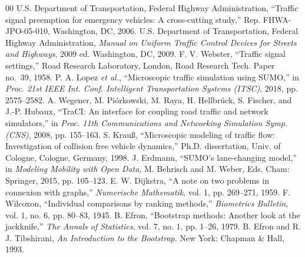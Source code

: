 \documentclass[conference]{IEEEtran}
\begin{document}
\begin{thebibliography}{00}
 U.S. Department of Transportation, Federal Highway Administration, ``Traffic signal preemption for emergency vehicles: A cross-cutting study,'' Rep. FHWA-JPO-05-010, Washington, DC, 2006.
 U.S. Department of Transportation, Federal Highway Administration, \emph{Manual on Uniform Traffic Control Devices for Streets and Highways}, 2009 ed. Washington, DC, 2009.
 F. V. Webster, ``Traffic signal settings,'' Road Research Laboratory, London, Road Research Tech. Paper no.~39, 1958.
 P. A. Lopez \emph{et al.}, ``Microscopic traffic simulation using SUMO,'' in \emph{Proc. 21st IEEE Int. Conf. Intelligent Transportation Systems (ITSC)}, 2018, pp. 2575--2582.
 A. Wegener, M. Pi\'{o}rkowski, M. Raya, H. Hellbr\"{u}ck, S. Fischer, and J.-P. Hubaux, ``TraCI: An interface for coupling road traffic and network simulators,'' in \emph{Proc. 11th Communications and Networking Simulation Symp. (CNS)}, 2008, pp. 155--163.
 S. Krau\ss, ``Microscopic modeling of traffic flow: Investigation of collision free vehicle dynamics,'' Ph.D. dissertation, Univ. of Cologne, Cologne, Germany, 1998.
 J. Erdmann, ``SUMO's lane-changing model,'' in \emph{Modeling Mobility with Open Data}, M. Behrisch and M. Weber, Eds. Cham: Springer, 2015, pp. 105--123.
 E. W. Dijkstra, ``A note on two problems in connexion with graphs,'' \emph{Numerische Mathematik}, vol. 1, pp. 269--271, 1959.
 F. Wilcoxon, ``Individual comparisons by ranking methods,'' \emph{Biometrics Bulletin}, vol. 1, no. 6, pp. 80--83, 1945.
 B. Efron, ``Bootstrap methods: Another look at the jackknife,'' \emph{The Annals of Statistics}, vol. 7, no. 1, pp. 1--26, 1979.
 B. Efron and R. J. Tibshirani, \emph{An Introduction to the Bootstrap}. New York: Chapman \& Hall, 1993.
\end{thebibliography}
\end{document}
